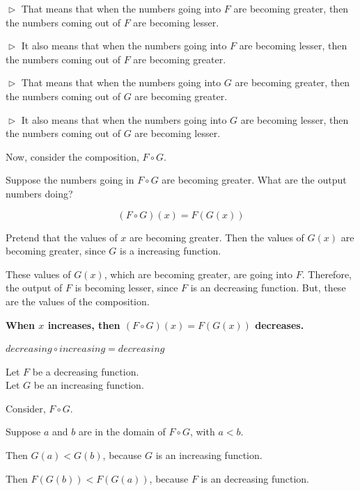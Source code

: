\documentclass{ximera}
\begin{document}
$\vartriangleright$ That means that when the numbers going into $F$ are becoming greater, then the numbers coming out of $F$ are becoming lesser. 

$\vartriangleright$ It also means that when the numbers going into $F$ are becoming lesser, then the numbers coming out of $F$ are becoming greater. 



$\vartriangleright$ That means that when the numbers going into $G$ are becoming greater, then the numbers coming out of $G$ are becoming greater. 


$\vartriangleright$ It also means that when the numbers going into $G$ are becoming lesser, then the numbers coming out of $G$ are becoming lesser. 



Now, consider the composition, $F \circ G$. 


Suppose the numbers going in $F \circ G$ are becoming greater.  What are the output numbers doing? 




\[ (F \circ G)(x) = F(G(x)) \]


Pretend that the values of $x$ are becoming greater. Then the values of $G(x)$ are becoming greater, since $G$ is a increasing function.

These values of $G(x)$, which are becoming greater, are going into $F$.  Therefore, the output of $F$ is becoming lesser, since $F$ is an decreasing function.  But, these are the values of the composition.


\begin{center}
\textbf{\textcolor{red!70!black}{When $x$ increases, then $(F \circ G)(x) = F(G(x))$ decreases.}}
\end{center}



\begin{fact}
$decreasing \circ increasing = decreasing$


Let $F$ be a decreasing function. \\
Let $G$ be an increasing function. 


Consider, $F \circ G$.

Suppose $a$ and $b$ are in the domain of $F \circ G$, with $a < b$. 

Then $G(a) < G(b)$, because $G$ is an increasing function. 

Then $F(G(b)) < F(G(a))$, because $F$ is an decreasing function.


\end{fact}
\end{document}
